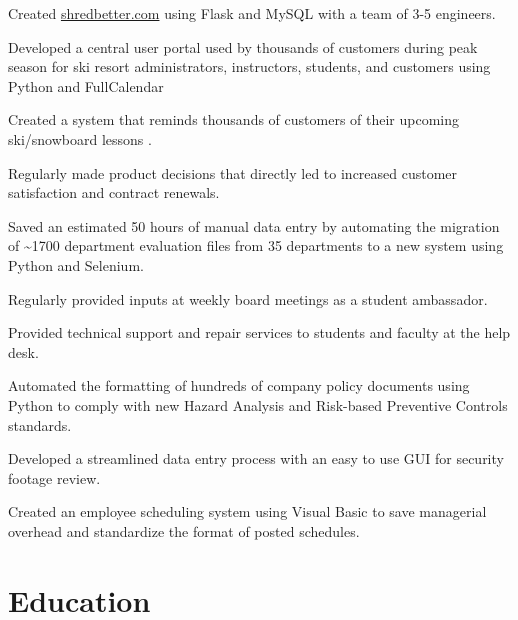 \documentclass[]{deedy-resume-openfont}
\begin{document}
\vspace{\topsep}
Created \href{https://shredbetter.com}{shredbetter.com} using Flask and MySQL with a team of 3-5 engineers.
\begin{tightemize}
\item Developed a central user portal used by thousands of customers during peak season for ski resort administrators, instructors, students, and customers using Python and FullCalendar
\item Created a system that reminds thousands of customers of their upcoming ski/snowboard lessons .
\item Regularly made product decisions that directly led to increased customer satisfaction and contract renewals.
\end{tightemize}
\sectionsep

\begin{tightemize}
\item Saved an estimated 50 hours of manual data entry by automating the migration of \textasciitilde 1700 department evaluation files from 35 departments to a new system using Python and Selenium.
\item Regularly provided inputs at weekly board meetings as a student ambassador.
\item Provided technical support and repair services to students and faculty at the help desk.
\end{tightemize}
\sectionsep

\begin{tightemize}
\item Automated the formatting of hundreds of company policy documents using Python to comply with new Hazard Analysis and Risk-based Preventive Controls standards.
\item Developed a streamlined data entry process with an easy to use GUI for security footage review.
\item Created an employee scheduling system using Visual Basic to save managerial overhead and standardize the format of posted schedules.
\end{tightemize}
\sectionsep

\section{Education}
\sectionsep
\end{document}

